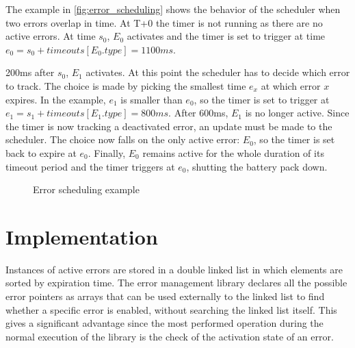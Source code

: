 The example in \autoref{fig:error_scheduling} shows the behavior of the scheduler when two errors overlap in time. At T+0 the timer is not running as there are no active errors. At time $s_0$, $E_0$ activates and the timer is set to trigger at time $e_0=s_0+timeouts[E_0.type]=1100ms$.

200ms after $s_0$, $E_1$ activates. At this point the scheduler has to decide which error to track. The choice is made by picking the smallest time $e_x$ at which error $x$ expires. In the example, $e_1$ is smaller than $e_0$, so the timer is set to trigger at $e_1=s_1+timeouts[E_1.type]=800ms$. After 600ms, $E_1$ is no longer active. Since the timer is now tracking a deactivated error, an update must be made to the scheduler. The choice now falls on the only active error: $E_0$, so the timer is set back to expire at $e_0$. Finally, $E_0$ remains active for the whole duration of its timeout period and the timer triggers at $e_0$, shutting the battery pack down.

\begin{figure}[h]
	\centering
	
	\caption{Error scheduling example}
	\label{fig:error_scheduling}
\end{figure}

\section{Implementation}
Instances of active errors are stored in a double linked list \cite{llist} in which elements are sorted by expiration time. The error management library declares all the possible error pointers as arrays that can be used externally to the linked list to find whether a specific error is enabled, without searching the linked list itself. This gives a significant advantage since the most performed operation during the normal execution of the library is the check of the activation state of an error.


